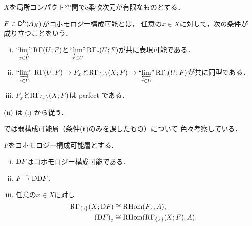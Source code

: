 \(X\)を局所コンパクト空間でc柔軟次元が有限なものとする．
\begin{leftbar}
\begin{DFN}
    \(F\in\Dompb(A_X)\)がコホモロジー構成可能とは，
    任意の\(x\in X\)に対して，次の条件が成り立つことをいう．
    \begin{enumerate}[(i)]
        \item \(\inddlim[x\in U]\RG(U;F)\)と\(\proolim[x\in U] \RG_c(U;F)\)が共に表現可能である．
        \item \(\sinddlim[x\in U]\RG(U;F)\to F_x\)と\(\RG_{\{x\}}(X;F)\to\proolim[x\in U] \RG_c(U;F)\)が共に同型である．
        \item \(F_x\)と\(\RG_{\{x\}}(X;F)\)は perfect である．
    \end{enumerate}
\end{DFN}
\end{leftbar}
\begin{RMK}[{\cite[Remark 3.4.2]{KS90}}]
    (ii) は (i) から従う．
\end{RMK}
\begin{CMT}
    \cite{HS23}では弱構成可能層（条件(ii)のみを課したもの）について
    色々考察している．
\end{CMT}
\begin{leftbar}
\begin{PRP}[{\cite[Proposition 3.4.3]{KS90}}]
    \(F\)をコホモロジー構成可能層とする．
    \begin{enumerate}[(i)]
        \item \(\rmD{F}\)はコホモロジー構成可能である．
        \item \(F\simar \rmD\rmD{F}\).
        \item 任意の\(x\in X\)に対し
        \begin{align*}
            \RG_{\{x\}}(X;\rmD{F})&\cong \RHom(F_x,A),\\
            \left(\rmD{F}\right)_x&\cong \RHom(\RG_{\{x\}}(X;F),A).        
        \end{align*}
    \end{enumerate}
\end{PRP}
\end{leftbar}

